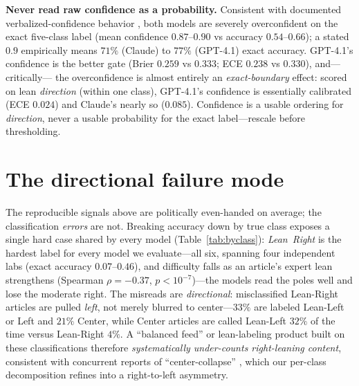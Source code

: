 \documentclass{article}
\begin{document}
\textbf{Never read raw confidence as a probability.} Consistent with
documented verbalized-confidence behavior
\citep{tian2023just,xiong2024can}, both models are
severely overconfident on the exact five-class label (mean confidence
$0.87$--$0.90$ vs accuracy $0.54$--$0.66$); a stated $0.9$ empirically
means $71\%$ (Claude) to $77\%$ (GPT-4.1) exact accuracy. GPT-4.1's
confidence is the better gate (Brier $0.259$ vs $0.333$; ECE $0.238$ vs
$0.330$), and---critically---
the overconfidence is almost entirely an \emph{exact-boundary} effect:
scored on lean \emph{direction} (within one class), GPT-4.1's confidence
is essentially calibrated (ECE $0.024$) and Claude's nearly so ($0.085$).
Confidence is a usable ordering for \emph{direction}, never a usable
probability for the exact label---rescale before thresholding.

\section{The directional failure mode}
\label{sec:fail}
The reproducible signals above are politically even-handed on average;
the classification \emph{errors} are not. Breaking accuracy down by true
class exposes a single hard case shared by every model
(Table~\ref{tab:byclass}): \emph{Lean~Right} is the hardest label for
every model we evaluate---all six, spanning four independent labs (exact
accuracy $0.07$--$0.46$), and difficulty falls as an article's expert
lean strengthens (Spearman $\rho{=}-0.37$, $p{<}10^{-7}$)---the models
read the poles well and lose the moderate right. The misreads are
\emph{directional}: misclassified Lean-Right articles are pulled
\emph{left}, not merely blurred to center---$33\%$ are labeled Lean-Left
or Left and $21\%$ Center, while Center articles are called Lean-Left
$32\%$ of the time versus Lean-Right $4\%$. A ``balanced feed'' or
lean-labeling product built on these classifications therefore
\emph{systematically under-counts right-leaning content}, consistent with
concurrent reports of ``center-collapse'' \citep{kennedy2026left}, which
our per-class decomposition refines into a right-to-left asymmetry.
\end{document}

